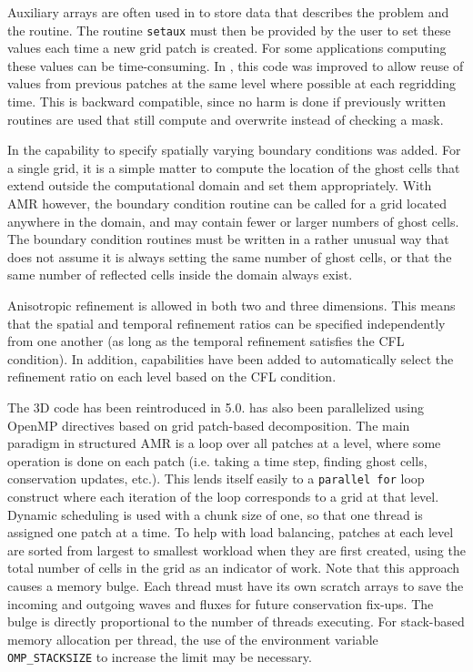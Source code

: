Auxiliary arrays are often used in \clawpack to store data that 
describes the problem and the routine.
The routine \texttt{setaux} must then be provided by the user to set these values each time a
new grid patch is created.  For some applications computing these values can be time-consuming.  In ,
this code was improved to allow reuse of values from previous patches at
the same level where possible at each regridding time. 
This is backward compatible, since no harm is done if previously
written routines are used that still compute and overwrite instead of
checking a mask.  

In  the capability to specify spatially varying boundary conditions
was added. For a single grid, it is a simple matter to
compute the location of the ghost cells that extend
outside the computational domain and set them appropriately.
With AMR however, the boundary condition routine can be called
for a grid located anywhere in the domain, and may contain fewer
or larger numbers of ghost cells. The boundary condition routines
must be written in a rather unusual way that does not assume it
is always setting the same number of ghost cells, or that the
same number of reflected cells inside the domain always exist.

Anisotropic refinement is allowed in both two and three dimensions.  This means that the spatial and temporal refinement ratios can be specified independently from one another (as long as the temporal refinement satisfies the CFL condition).
In addition, capabilities have been added to automatically select the 
refinement ratio on each level based on the CFL condition.

The 3D \amrclaw code has been reintroduced in 5.0. \amrclaw has also been
parallelized using OpenMP directives based on grid patch-based decomposition.
The main paradigm in structured AMR is a loop over all patches at a level, where
some operation is done on each patch (i.e. taking a time step, finding ghost
cells, conservation updates, etc.).  This lends itself easily to a {\tt parallel
for} loop construct where each iteration of the loop corresponds to a grid at
that level. Dynamic scheduling is used with a chunk size of one, so that one
thread is assigned one patch at a time. To help with load balancing, patches at
each level are sorted from largest to smallest workload when they are first
created, using the total number of cells in the grid as an indicator of work.
Note that this approach causes a memory bulge. Each thread must have its own
scratch arrays to save the incoming and outgoing waves and fluxes for future
conservation fix-ups. The bulge is directly proportional to the number of
threads executing. For stack-based memory allocation per thread, the use of the
environment variable {\tt OMP\_STACKSIZE} to increase the limit may be
necessary.

